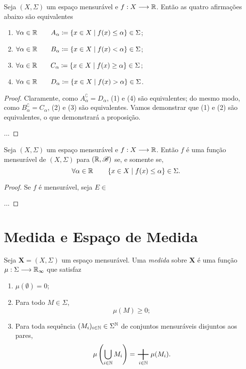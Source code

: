 \begin{prop}
	Seja $(X,\Sigma)$ um espaço mensurável e $f: X \longrightarrow \mathbb{R}$. Então as quatro afirmações abaixo são equivalentes
	\begin{enumerate}
	\item $\forall \alpha \in \mathbb{R} \qquad A_\alpha \coloneqq \left\{x \in X \;\middle\vert\; f(x) \leq \alpha \right\} \in \Sigma$;
	\item $\forall \alpha \in \mathbb{R} \qquad B_\alpha \coloneqq \left\{x \in X \;\middle\vert\; f(x) < \alpha \right\} \in \Sigma$;
	\item $\forall \alpha \in \mathbb{R} \qquad C_\alpha \coloneqq \left\{x \in X \;\middle\vert\; f(x) \geq \alpha \right\} \in \Sigma$;
	\item $\forall \alpha \in \mathbb{R} \qquad D_\alpha \coloneqq \left\{x \in X \;\middle\vert\; f(x) > \alpha \right\} \in \Sigma$.
	\end{enumerate}
\end{prop}
\begin{proof}
	Claramente, como $A_\alpha^\complement = D_\alpha$, (1) e (4) são equivalentes; do mesmo modo, como $B_\alpha^\complement = C_\alpha$, (2) e (3) são equivalentes. Vamos demonstrar que (1) e (2) são equivalentes, o que demonstrará a proposição.
	
	...	
\end{proof}

\begin{prop}
	Seja $(X,\Sigma)$ um espaço mensurável e $f: X \longrightarrow \mathbb{R}$. Então $f$ é uma função mensurável de $(X,\Sigma)$ para $(\mathbb{R},\mathscr{B})$ se, e somente se,
	\begin{equation*}
	\forall \alpha \in \mathbb{R} \qquad \left\{x \in X \;\middle\vert\; f(x) \leq \alpha \right\} \in \Sigma.
	\end{equation*}
\end{prop}
\begin{proof}
	Se $f$ é mensurável, seja $E \in$
	
	...
\end{proof}
\newpage









\section{Medida e Espaço de Medida}

\begin{defi}
Seja $\bm X=(X,\Sigma)$ um espaço mensurável. Uma \emph{medida} sobre $\bm X$ é uma função $\mu : \Sigma \longrightarrow \mathbb{R}_\infty$ que satisfaz
	\begin{enumerate}
	\item $\mu(\emptyset)=0$;
	\item Para todo $M \in \Sigma$,
	\begin{equation*}
	\mu(M) \geq 0;
	\end{equation*}
	\item Para toda sequência $(M_i)_{i \in \mathbb{N}} \in \Sigma^{\mathbb{N}}$ de conjuntos mensuráveis disjuntos aos pares,
	\begin{equation*}
	\mu\left(\bigcup_{i \in \N} M_i\right)=\bigplus_{i \in \N} \mu(M_i).
	\end{equation*}
	\end{enumerate}
\end{defi}

